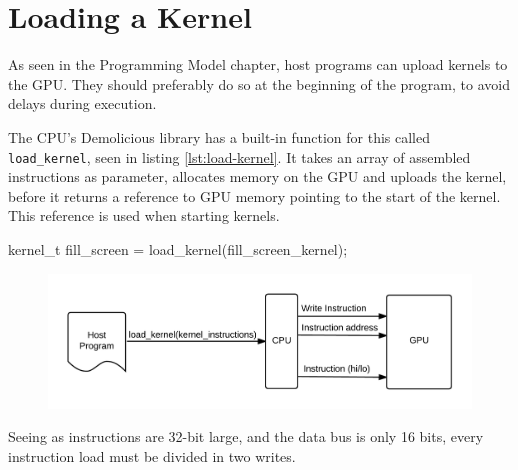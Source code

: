 \section{Loading a Kernel}
As seen in the Programming Model chapter, host programs can upload kernels to the GPU.
They should preferably do so at the beginning of the program, to avoid delays during execution.

The CPU's Demolicious library has a built-in function for this called \verb/load_kernel/, seen in listing \ref{lst:load-kernel}.
It takes an array of assembled instructions as parameter,
allocates memory on the GPU and uploads the kernel,
before it returns a reference to GPU memory pointing to the start of the kernel.
This reference is used when starting kernels.

\begin{c-code}[caption=A load\_kernel function call with the fillscreen kernel, label=lst:load-kernel]
kernel_t fill_screen = load_kernel(fill_screen_kernel);
\end{c-code}

\begin{figure}[H]
    \centering
    \includegraphics[width=\textwidth]{../cpu/diagrams/loading_a_kernel.png}
    \caption{}
    \label{fig:loading_a_kernel}
\end{figure}

Seeing as instructions are 32-bit large, and the data bus is only 16 bits,
every instruction load must be divided in two writes.
